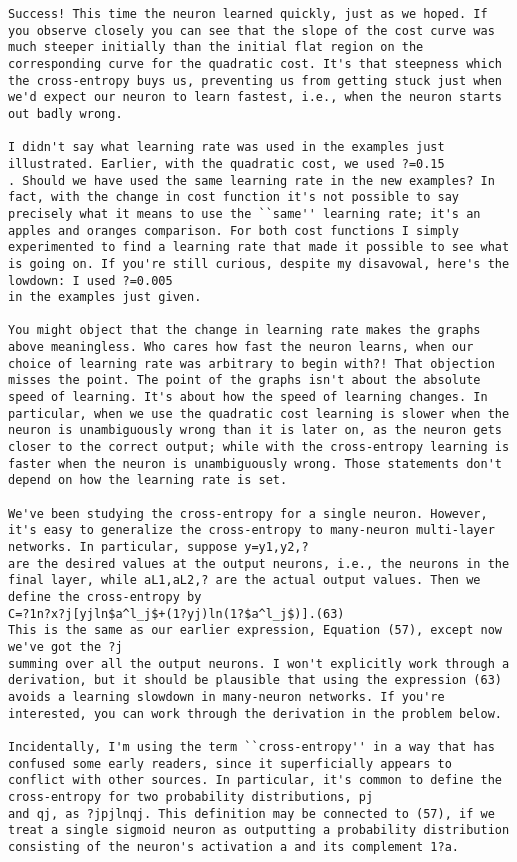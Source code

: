 \begin{lstlisting}
Success! This time the neuron learned quickly, just as we hoped. If you observe closely you can see that the slope of the cost curve was much steeper initially than the initial flat region on the corresponding curve for the quadratic cost. It's that steepness which the cross-entropy buys us, preventing us from getting stuck just when we'd expect our neuron to learn fastest, i.e., when the neuron starts out badly wrong.

I didn't say what learning rate was used in the examples just illustrated. Earlier, with the quadratic cost, we used ?=0.15
. Should we have used the same learning rate in the new examples? In fact, with the change in cost function it's not possible to say precisely what it means to use the ``same'' learning rate; it's an apples and oranges comparison. For both cost functions I simply experimented to find a learning rate that made it possible to see what is going on. If you're still curious, despite my disavowal, here's the lowdown: I used ?=0.005
in the examples just given.

You might object that the change in learning rate makes the graphs above meaningless. Who cares how fast the neuron learns, when our choice of learning rate was arbitrary to begin with?! That objection misses the point. The point of the graphs isn't about the absolute speed of learning. It's about how the speed of learning changes. In particular, when we use the quadratic cost learning is slower when the neuron is unambiguously wrong than it is later on, as the neuron gets closer to the correct output; while with the cross-entropy learning is faster when the neuron is unambiguously wrong. Those statements don't depend on how the learning rate is set. 

We've been studying the cross-entropy for a single neuron. However, it's easy to generalize the cross-entropy to many-neuron multi-layer networks. In particular, suppose y=y1,y2,?
are the desired values at the output neurons, i.e., the neurons in the final layer, while aL1,aL2,? are the actual output values. Then we define the cross-entropy by 
C=?1n?x?j[yjln$a^l_j$+(1?yj)ln(1?$a^l_j$)].(63)
This is the same as our earlier expression, Equation (57), except now we've got the ?j
summing over all the output neurons. I won't explicitly work through a derivation, but it should be plausible that using the expression (63) avoids a learning slowdown in many-neuron networks. If you're interested, you can work through the derivation in the problem below. 

Incidentally, I'm using the term ``cross-entropy'' in a way that has confused some early readers, since it superficially appears to conflict with other sources. In particular, it's common to define the cross-entropy for two probability distributions, pj
and qj, as ?jpjlnqj. This definition may be connected to (57), if we treat a single sigmoid neuron as outputting a probability distribution consisting of the neuron's activation a and its complement 1?a.


\end{lstlisting}
